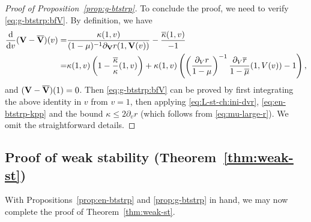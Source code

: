 \documentclass[10pt, reqno]{amsart}
\theoremstyle{definition}
\theoremstyle{remark}
\theoremstyle{conjecture}
\numberwithin{equation}{section}
\newcommand{\ud}{\mathrm{d}}
\newcommand{\rd}{\partial}
\newcommand{\0}{\emptyset}
\newcommand{\kpp}{\kappa}
\newcommand{\lmb}{\lambda}
\newcommand{\bfV}{{\bf V}}
\newcommand{\dvr}{\lmb}
\newcommand{\bfVbg}{\overline{\bfV}}				%
\newcommand{\rbg}{\overline{r}}					%
\newcommand{\mubg}{\overline{\mu}}				%
\newcommand{\kppbg}{\overline{\kpp}}					%
\begin{document}
\begin{proof}[Proof of Proposition~\ref{prop:g-btstrp}]
To conclude the proof, we need to verify \eqref{eq:g-btstrp:bfV}. By definition, we have
\begin{align*}
	\frac{\ud}{\ud v} (\bfV - \bfVbg)(v)
	 = & \frac{\kpp(1, v)}{(1-\mu)^{-1} \rd_{\bfV} r(1, \bfV(v))} - \frac{\kppbg(1, v)}{-1} \\
	 = & \kpp(1, v) \left(1 - \frac{\kppbg}{\kpp}(1, v)\right) + \kpp(1, v) \left( \left(\frac{\rd_{V} r}{1-\mu}\right)^{-1} \frac{\rd_{V} \rbg}{1-\mubg} (1, V(v)) - 1\right),
\end{align*}
and $(\bfV - \overline{\bfV})(1) = 0$. Then \eqref{eq:g-btstrp:bfV} can be proved by first integrating the above identity in $v$ from $v=1$, then applying \eqref{eq:L-st-ch:ini-dvr}, \eqref{eq:en-btstrp-kpp} and the bound $\kpp \leq 2 \rd_{v} r$ (which follows from \eqref{eq:mu-large-r}). We omit the straightforward details. \qedhere
\end{proof}

\subsection{Proof of weak stability (Theorem~\ref{thm:weak-st})} \label{subsec:weak-st-pf}
With Propositions~\ref{prop:en-btstrp} and \ref{prop:g-btstrp} in hand, we may now complete the proof of Theorem~\ref{thm:weak-st}.
\end{document}
